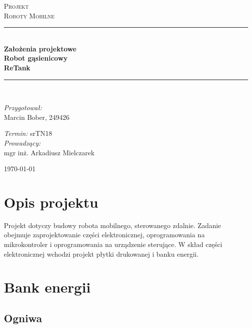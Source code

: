 \documentclass[10pt, a4paper]{article}
\begin{document}
\def\tablename{Tabela}

\begin{titlepage}
	\begin{center}
		\textsc{\LARGE Projekt}\\[1cm]		
		\textsc{\Large Roboty Mobilne}\\[0.5cm]		
		\rule{\textwidth}{0.08cm}\\[0.4cm]
		{\huge \bfseries Założenia projektowe}\\[1cm]
		{\huge \bfseries Robot gąsienicowy}\\[0.5cm]
		{\huge \bfseries ReTank}\\[0.4cm]
		\rule{\textwidth}{0.08cm}\\[1cm]
		
		\begin{flushright} \large
		\emph{Przygotował:}\\
		Marcin Bober, 249426
		
		\emph{Termin: }srTN18\\[0.4cm]

		\emph{Prowadzący:} \\
		mgr inż. Arkadiusz Mielczarek \\
		
		\end{flushright}
		
		\vfill
		
		{\large \today}
	\end{center}	
\end{titlepage}

\newpage
\tableofcontents
\newpage

\section{Opis projektu}
\label{sec:OpisProjektu}

Projekt dotyczy budowy robota mobilnego, sterowanego zdalnie. 
Zadanie obejmuje zaprojektowanie części elektronicznej, oprogramowania na mikrokontroler i oprogramowania na urządzenie sterujące. 
W skład części elektronicznej wchodzi projekt płytki drukowanej i banku energii.


\section{Bank energii}

\subsection{Ogniwa}
\end{document}

